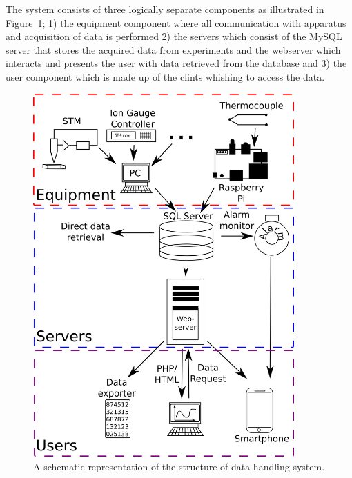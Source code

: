 The system consists of three logically separate components as illustrated in
Figure~\ref{fig:system_overview}; 1) the equipment component where all
communication with apparatus and acquisition of data is performed 2) the
servers which consist of the MySQL server that stores the acquired data from
experiments and the webserver which interacts and presents the user with data
retrieved from the database and 3) the user component which is made up of the
clints whishing to access the data. \begin{figure}
 \begin{center}
 \includegraphics[width=10cm]{system_overview.png}
 \caption{
   A schematic representation of the structure of data handling system.
   \label{fig:system_overview}
 } 
 \end{center}
\end{figure}

